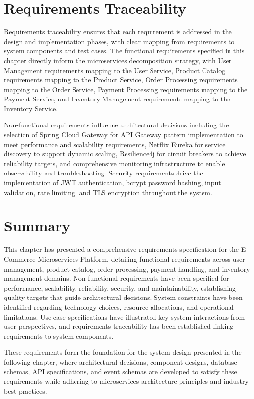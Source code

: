 \section{Requirements Traceability}

Requirements traceability ensures that each requirement is addressed in the design and implementation phases, with clear mapping from requirements to system components and test cases. The functional requirements specified in this chapter directly inform the microservices decomposition strategy, with User Management requirements mapping to the User Service, Product Catalog requirements mapping to the Product Service, Order Processing requirements mapping to the Order Service, Payment Processing requirements mapping to the Payment Service, and Inventory Management requirements mapping to the Inventory Service.

Non-functional requirements influence architectural decisions including the selection of Spring Cloud Gateway for API Gateway pattern implementation to meet performance and scalability requirements, Netflix Eureka for service discovery to support dynamic scaling, Resilience4j for circuit breakers to achieve reliability targets, and comprehensive monitoring infrastructure to enable observability and troubleshooting. Security requirements drive the implementation of JWT authentication, bcrypt password hashing, input validation, rate limiting, and TLS encryption throughout the system.

\section{Summary}

This chapter has presented a comprehensive requirements specification for the E-Commerce Microservices Platform, detailing functional requirements across user management, product catalog, order processing, payment handling, and inventory management domains. Non-functional requirements have been specified for performance, scalability, reliability, security, and maintainability, establishing quality targets that guide architectural decisions. System constraints have been identified regarding technology choices, resource allocations, and operational limitations. Use case specifications have illustrated key system interactions from user perspectives, and requirements traceability has been established linking requirements to system components.

These requirements form the foundation for the system design presented in the following chapter, where architectural decisions, component designs, database schemas, API specifications, and event schemas are developed to satisfy these requirements while adhering to microservices architecture principles and industry best practices.
